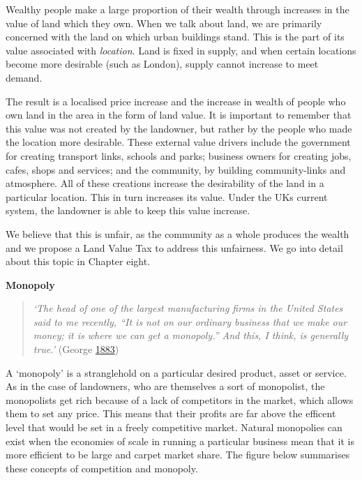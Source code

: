 \documentclass[]{tufte-handout}
\begin{document}
Wealthy people make a large proportion of their wealth through increases
in the value of land which they own. When we talk about land, we are
primarily concerned with the land on which urban buildings stand. This
is the part of its value associated with \emph{location}. Land is fixed
in supply, and when certain locations become more desirable (such as
London), supply cannot increase to meet demand.

The result is a localised price increase and the increase in wealth of
people who own land in the area in the form of land value. It is
important to remember that this value was not created by the landowner,
but rather by the people who made the location more desirable. These
external value drivers include the government for creating transport
links, schools and parks; business owners for creating jobs, cafes,
shops and services; and the community, by building community-links and
atmosphere. All of these creations increase the desirability of the land
in a particular location. This in turn increases its value. Under the
UKs current system, the landowner is able to keep this value increase.

We believe that this is unfair, as the community as a whole produces the
wealth and we propose a Land Value Tax to address this unfairness. We go
into detail about this topic in Chapter eight.

\textbf{Monopoly}

\begin{quote}
\emph{`The head of one of the largest manufacturing firms in the United
States said to me recently, ``It is not on our ordinary business that we
make our money; it is where we can get a monopoly.'' And this, I think,
is generally true.'} (George \protect\hyperlink{ref-George}{1883})
\end{quote}

A `monopoly' is a stranglehold on a particular desired product, asset or
service. As in the case of landowners, who are themselves a sort of
monopolist, the monopolists get rich because of a lack of competitors in
the market, which allows them to set any price. This means that their
profits are far above the efficent level that would be set in a freely
competitive market. Natural monopolies can exist when the economies of
scale in running a particular business mean that it is more efficient to
be large and carpet market share. The figure below summarises these
concepts of competition and monopoly.
\end{document}
